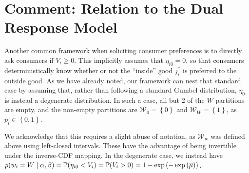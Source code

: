 \documentclass{article}
\begin{document}
\section*{Comment: Relation to the \textcite{Brazell_2006} Dual Response Model}

Another common framework when soliciting consumer preferences is to directly ask consumers if $V_i \ge 0$. This implicitly assumes that $\eta_{i0} = 0$, so that consumers deterministically know whether or not the ``inside'' good $j^*_i$ is preferred to the outside good. As we have already noted, our framework can nest that standard case by assuming that, rather than following a standard Gumbel distribution, $\eta_0$ is instead a degenerate distribution. In such a case, all but 2 of the $W$ partitions are empty, and the non-empty partitions are $\mathcal{W}_0 = \left\lbrace 0 \right\rbrace$ and $\mathcal{W}_W = \left\lbrace 1\right\rbrace$, as $p_i \in \left\lbrace 0, 1\right\rbrace$.

We acknowledge that this requires a slight abuse of notation, as $\mathcal{W}_w$ was defined above using left-closed intervals. These have the advantage of being invertible under the inverse-CDF mapping. In the degenerate case, we instead have $p\mleft(w_i = W\mid\alpha,\beta\mright) = \mathbb{P}\mleft(\eta_{i0} < V_i\mright) = \mathbb{P}\mleft(V_i > 0\mright) = 1 - \exp\left(-\exp\left(\overline{\mu}\right)\right)$.


\clearpage
\printbibliography
\end{document}

